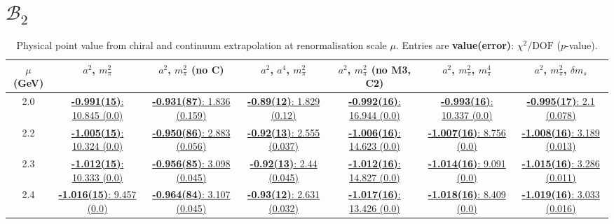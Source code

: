 \documentclass[12pt]{extarticle}
\begin{document}
\section{$\mathcal{B}_2$}
\begin{table}[h!]
\begin{center}
\begin{tabular}{|c|c|c|c|c|c|c|}
\hline
$\mu$ (GeV) & $a^2$, $m_\pi^2$& $a^2$, $m_\pi^2$ (no C)& $a^2$, $a^4$, $m_\pi^2$& $a^2$, $m_\pi^2$ (no M3, C2)& $a^2$, $m_\pi^2$, $m_\pi^4$& $a^2$, $m_\pi^2$, $\delta m_s$\\
\hline
2.0& \hyperlink{VVmAA/NPR/a2m2_20.pdf.1}{\textbf{-0.991(15)}: 10.845 (0.0)} & \hyperlink{VVmAA/NPR/a2m2noC_20.pdf.1}{\textbf{-0.931(87)}: 1.836 (0.159)} & \hyperlink{VVmAA/NPR/a2a4m2_20.pdf.1}{\textbf{-0.89(12)}: 1.829 (0.12)} & \hyperlink{VVmAA/NPR/a2m2mcut_20.pdf.1}{\textbf{-0.992(16)}: 16.944 (0.0)} & \hyperlink{VVmAA/NPR/a2m2m4_20.pdf.1}{\textbf{-0.993(16)}: 10.337 (0.0)} & \hyperlink{VVmAA/NPR/a2m2delm_20.pdf.1}{\textbf{-0.995(17)}: 2.1 (0.078)}\\
2.2& \hyperlink{VVmAA/NPR/a2m2_22.pdf.1}{\textbf{-1.005(15)}: 10.324 (0.0)} & \hyperlink{VVmAA/NPR/a2m2noC_22.pdf.1}{\textbf{-0.950(86)}: 2.883 (0.056)} & \hyperlink{VVmAA/NPR/a2a4m2_22.pdf.1}{\textbf{-0.92(13)}: 2.555 (0.037)} & \hyperlink{VVmAA/NPR/a2m2mcut_22.pdf.1}{\textbf{-1.006(16)}: 14.623 (0.0)} & \hyperlink{VVmAA/NPR/a2m2m4_22.pdf.1}{\textbf{-1.007(16)}: 8.756 (0.0)} & \hyperlink{VVmAA/NPR/a2m2delm_22.pdf.1}{\textbf{-1.008(16)}: 3.189 (0.013)}\\
2.3& \hyperlink{VVmAA/NPR/a2m2_23.pdf.1}{\textbf{-1.012(15)}: 10.333 (0.0)} & \hyperlink{VVmAA/NPR/a2m2noC_23.pdf.1}{\textbf{-0.956(85)}: 3.098 (0.045)} & \hyperlink{VVmAA/NPR/a2a4m2_23.pdf.1}{\textbf{-0.92(13)}: 2.44 (0.045)} & \hyperlink{VVmAA/NPR/a2m2mcut_23.pdf.1}{\textbf{-1.012(16)}: 14.827 (0.0)} & \hyperlink{VVmAA/NPR/a2m2m4_23.pdf.1}{\textbf{-1.014(16)}: 9.091 (0.0)} & \hyperlink{VVmAA/NPR/a2m2delm_23.pdf.1}{\textbf{-1.015(16)}: 3.286 (0.011)}\\
2.4& \hyperlink{VVmAA/NPR/a2m2_24.pdf.1}{\textbf{-1.016(15)}: 9.457 (0.0)} & \hyperlink{VVmAA/NPR/a2m2noC_24.pdf.1}{\textbf{-0.964(84)}: 3.107 (0.045)} & \hyperlink{VVmAA/NPR/a2a4m2_24.pdf.1}{\textbf{-0.93(12)}: 2.631 (0.032)} & \hyperlink{VVmAA/NPR/a2m2mcut_24.pdf.1}{\textbf{-1.017(16)}: 13.426 (0.0)} & \hyperlink{VVmAA/NPR/a2m2m4_24.pdf.1}{\textbf{-1.018(16)}: 8.409 (0.0)} & \hyperlink{VVmAA/NPR/a2m2delm_24.pdf.1}{\textbf{-1.019(16)}: 3.033 (0.016)}\\
\hline
\end{tabular}
\caption{Physical point value from chiral and continuum extrapolation at renormalisation scale $\mu$. Entries are \textbf{value(error)}: $\chi^2/\text{DOF}$ ($p$-value).}
\end{center}
\end{table}
\end{document}
